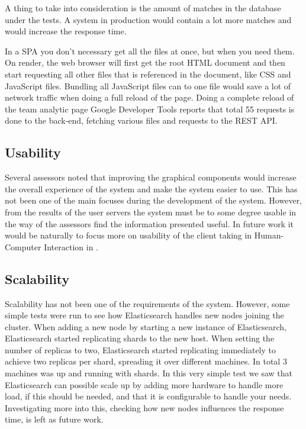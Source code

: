 A thing to take into consideration is the amount of matches in the database under the tests. A system in production would contain a lot more matches and would increase the response time. 

In a \ac{SPA} you don't necessary get all the files at once, but when you need them. On render, the web browser will first get the root \ac{HTML} document and then start requesting all other files that is referenced in the document, like \ac{CSS} and JavaScript files. Bundling all JavaScript files can to one file would save a lot of network traffic when doing a full reload of the page. Doing a complete reload of the team analytic page Google Developer Tools reports that total 55 requests is done to the back-end, fetching various files and requests to the REST API.

\subsection{Usability}

Several assessors noted that improving the graphical components would increase the overall experience of the system and make the system easier to use. This has not been one of the main focuses during the development of the system. However, from the results of the user servers the system must be to some degree usable in the way of the assessors find the information presented useful. In future work it would be naturally to focus more on usability of the client taking in Human-Computer Interaction in \cite{hci}.

\subsection{Scalability}

Scalability has not been one of the requirements of the system. However, some simple tests were run to see how Elasticsearch handles new nodes joining the cluster. When adding a new node by starting a new instance of Elasticsearch, Elasticsearch started replicating shards to the new host. When setting the number of replicas to two, Elasticsearch started replicating immediately to achieve two replicas per shard, spreading it over different machines. In total 3 machines was up and running with shards. In this very simple test we saw that Elasticsearch can possible scale up by adding more hardware to handle more load, if this should be needed, and that it is configurable to handle your needs. Investigating more into this, checking how new nodes influences the response time, is left as future work.





